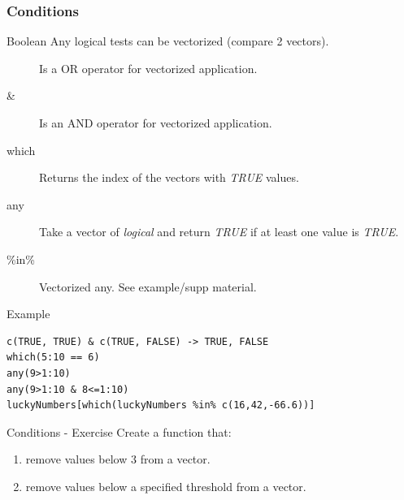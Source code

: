 \documentclass[10pt]{beamer}
\newenvironment{xframe}[2][]
  {\begin{frame}[fragile,environment=xframe,#1]
  \frametitle{#2}}
  {\end{frame}}
\begin{document}
\begin{xframe}{Conditions}
  \begin{block}{Boolean}
  Any logical tests can be vectorized (compare 2 vectors).
    \begin{description}
       \item[\mid] Is a OR operator for vectorized application.
    \item[\&] Is an AND operator for vectorized application.
    \item[which] Returns the index of the vectors with {\it TRUE} values.
    \item[any] Take a vector of {\it logical} and return {\it TRUE} if at least one value is {\it TRUE}.
    \item[\%in\%] Vectorized any. See example/supp material.
    \end{description}
  \end{block}
  \begin{exampleblock}{Example}
\begin{verbatim}
c(TRUE, TRUE) & c(TRUE, FALSE) -> TRUE, FALSE
which(5:10 == 6)
any(9>1:10)
any(9>1:10 & 8<=1:10)
luckyNumbers[which(luckyNumbers %in% c(16,42,-66.6))]
\end{verbatim}  
  \end{exampleblock}
\end{xframe}

\begin{frame}{Conditions - Exercise}
  Create a function that: 
  \begin{enumerate}
  \item remove values below $3$ from a vector.
  \item  remove values below a specified threshold from a vector.
  \end{enumerate}
\end{frame}


\end{document}
